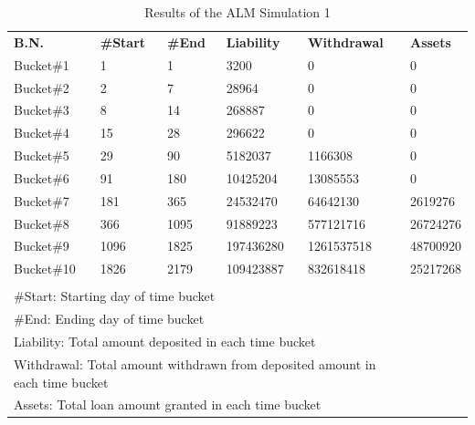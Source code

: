 \begin{table}[h!]
  \begin{center}
    \caption{Results of the ALM Simulation 1}
    \label{tab:Results of the ALM Simulation 1}
    \begin{tabular}{l|l|l|l|l|l} %
      \hline
     \textbf{B.N.}&\textbf{\#Start}&\textbf{\#End} &\textbf{Liability}&\textbf{Withdrawal}&\textbf{Assets}\\
	\hdashline
	\hdashline
      Bucket\#1 & 1 & 1 & 3200 & 0 & 0 \\
	\hline
      Bucket\#2 & 2 &  7 & 28964 & 0 & 0\\
	\hline
      Bucket\#3 & 8 & 14 & 268887 & 0 & 0 \\
	\hline
      Bucket\#4 & 15 & 28 & 296622 & 0 & 0 \\
	\hline
      Bucket\#5 & 29 & 90 & 5182037 & 1166308 & 0 \\
	\hline
      Bucket\#6 & 91 & 180 & 10425204 & 13085553 & 0 \\
	\hline
      Bucket\#7 & 181 & 365 & 24532470 & 64642130 & 2619276 \\
	\hline
      Bucket\#8 & 366 & 1095 & 91889223 & 577121716 & 26724276 \\
	\hline
      Bucket\#9 & 1096 & 1825 & 197436280 & 1261537518 & 48700920 \\
	\hline
      Bucket\#10 & 1826 & 2179 & 109423887 & 832618418 & 25217268  \\

	\hdashline
	\hdashline
	\multicolumn{5}{l}{B.N. : Bucket Number} \\
	\multicolumn{5}{l}{\#Start: Starting day of time bucket} \\
	\multicolumn{5}{l}{\#End: Ending day of time bucket} \\
	\multicolumn{5}{l}{Liability: Total amount deposited in each time bucket} \\
	\multicolumn{5}{l}{Withdrawal: Total amount withdrawn from deposited amount in each time bucket} \\
	\multicolumn{5}{l}{Assets: Total loan amount granted in each time bucket} \\
	\hline
    \end{tabular}
  \end{center}
\end{table}


